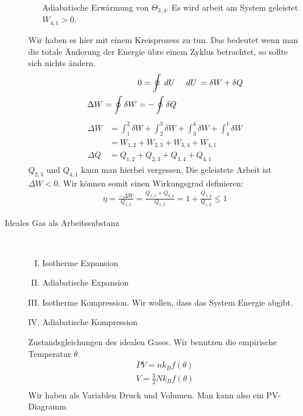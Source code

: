 \begin{description}
\begin{enumerate}[I)]
        Adiabatische Erw\"armung von $\Theta_{3,4}$. Es wird arbeit
        am System geleistet $W_{4,1} > 0$.
    \end{enumerate}
    Wir haben es hier mit einem Kreisprozess zu tun. Das bedeutet wenn man die totale
    \"Anderung der Energie \"ubre einem Zyklus betrachtet, so sollte sich nichts
    \"andern.
    \begin{align*}
      0 = \oint_{}^{} \,dU\,  && \,dU\, = \delta W + \delta Q \\
      \Delta W = \oint_{}^{} \delta W = - \oint_{}^{} \delta Q
    \end{align*}
    \begin{align*}
      \Delta W  & = \int_{1}^{2} \delta W + \int_{2}^{3} \delta W + 
      \int_{3}^{4} \delta W + \int_{4}^{1} \delta W  \\ & = W_{1,2} +W_{2,3} +W_{3,4} +W_{4,1}  \\
      \Delta Q & = Q_{1,2} + Q_{2,3} + Q_{3,4} + Q_{4,1}
    \end{align*}
    $Q_{2,3}$ und $Q_{4,1}$ kann man hierbei vergessen. Die geleistete Arbeit
    ist  $\Delta W < 0$. Wir k\"onnen somit einen Wirkungsgrad definieren:
    \begin{align*}
      \eta = \frac{-\Delta W}{Q_{1,2}} = \frac{Q_{1,2} + Q_{3,4}}{Q_{1,2}}
      = 1 + \frac{Q_{3,4}}{Q_{1,2}} \le 1
    \end{align*}
  \item[Ideales Gas als Arbeitssubstanz] $ $ \\
    \begin{enumerate}[I)]
      \item Isotherme Expansion
      \item Adiabatische Expansion
      \item Isotherme Kompression. Wir wollen, dass das System Energie abgibt.
      \item Adiabatische Kompression
    \end{enumerate} 
    Zustandsgleichungen des idealen Gases. Wir benutzen die empirische Temperatur $\theta$.
    \begin{align*}
      P V = n k_B f(\theta) \\
      V = \frac{3}{2} N k_B f(\theta) \\
    \end{align*}
    Wir haben als Variablen Druck und Volumen. Man kann also ein PV-Diagramm

\end{description}
